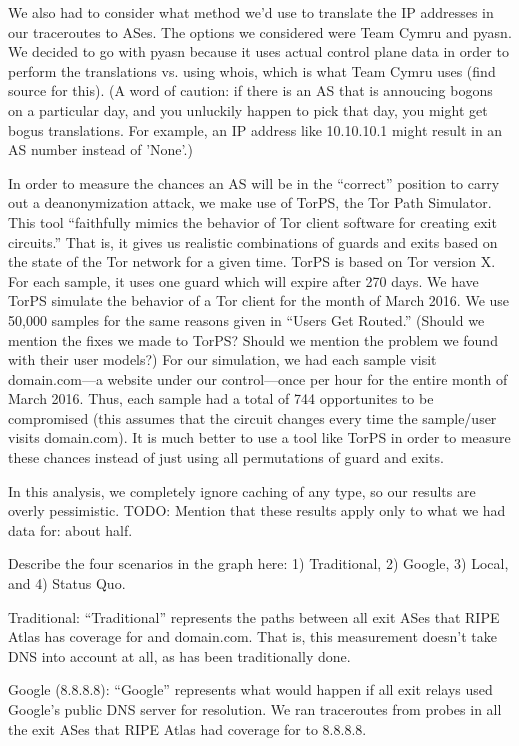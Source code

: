 We also had to consider what method we'd use to translate the IP addresses in our 
traceroutes to ASes. The options we considered were Team Cymru and pyasn. We decided to 
go with pyasn because it uses actual control plane data in order to perform the 
translations vs. using whois, which is what Team Cymru uses (find source for this). 
(A word of caution: if there is an AS that is annoucing bogons on a particular day, and 
you unluckily happen to pick that day, you might get bogus translations. For example, an 
IP address like 10.10.10.1 might result in an AS number instead of 'None'.)

In order to measure the chances an AS will be in the ``correct'' position to carry out a
deanonymization attack, we make use of TorPS, the Tor Path Simulator. This tool 
``faithfully mimics the behavior of Tor client software for creating exit circuits.''
That is, it gives us realistic combinations of guards and exits based on the state of the 
Tor network for a given time. TorPS is based on Tor version X. For each sample, it uses 
one guard which will expire after 270 days. We have TorPS simulate the behavior of a Tor 
client for the month of March 2016. We use 50,000 samples for the same reasons given in
``Users Get Routed.'' (Should we mention the fixes we made to TorPS? Should we mention 
the problem we found with their user models?) For our simulation, we had each sample 
visit domain.com---a website under our control---once per hour for the entire
month of March 2016. Thus, each sample had a total of 744 opportunites to be
compromised (this assumes that the circuit changes every time the sample/user
visits domain.com). It is much better to use a tool like TorPS in order to
measure these chances instead of just using all permutations of guard and
exits.

In this analysis, we completely ignore caching of any type, so our results are overly 
pessimistic. TODO: Mention that these results apply only to what we had data for: about 
half.

Describe the four scenarios in the graph here: 1) Traditional, 2) Google, 3) Local, and 
4) Status Quo.

Traditional: ``Traditional'' represents the paths between all exit ASes that RIPE Atlas 
has coverage for and domain.com. That is, this measurement doesn't take DNS into account 
at all, as has been traditionally done.

Google (8.8.8.8): ``Google'' represents what would happen if all exit relays used 
Google's public DNS server for resolution. We ran traceroutes from probes in all the exit 
ASes that RIPE Atlas had coverage for to 8.8.8.8.

